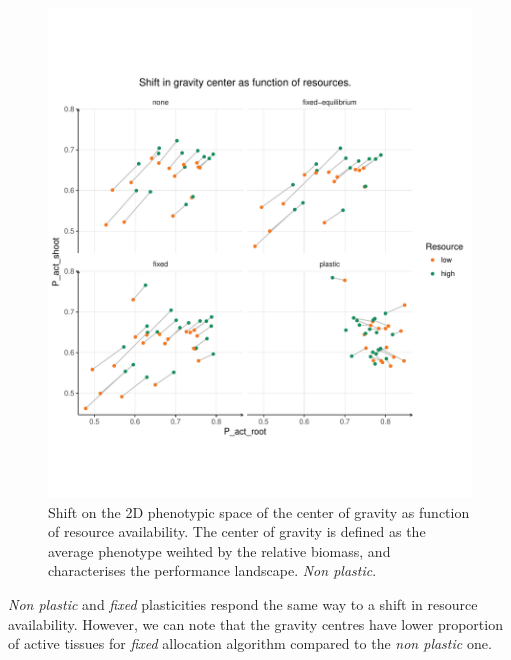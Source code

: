 \begin{figure}\label{fig:gravity_shift_resource}
\includegraphics[width = \textwidth]{./2_PP/Figures/Landscape/ld_gravity_resourceall.pdf}
\caption{Shift on the 2D phenotypic space of the center of gravity as function of resource availability. The center of gravity is defined as the average phenotype weihted by the relative biomass, and characterises the performance landscape. \textit{Non plastic}.}
\end{figure}

\textit{Non plastic} and \textit{fixed} plasticities respond the same way to a shift in resource availability. However, we can note that the gravity centres have lower proportion of active tissues for \textit{fixed} allocation algorithm compared to the \textit{non plastic} one.

%
%
%
%
%
%


